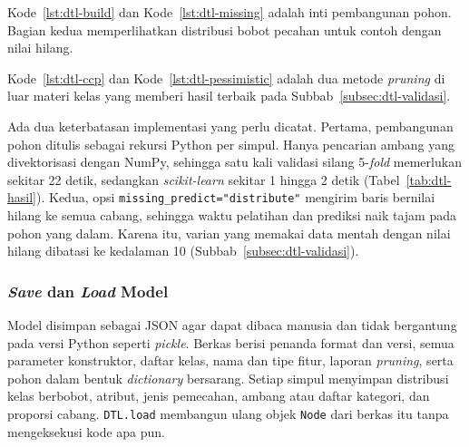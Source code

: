 
Kode~\ref{lst:dtl-build} dan Kode~\ref{lst:dtl-missing} adalah inti pembangunan pohon. Bagian kedua
memperlihatkan distribusi bobot pecahan untuk contoh dengan nilai hilang.


Kode~\ref{lst:dtl-ccp} dan Kode~\ref{lst:dtl-pessimistic} adalah dua metode \textit{pruning} di luar
materi kelas yang memberi hasil terbaik pada Subbab~\ref{subsec:dtl-validasi}.


Ada dua keterbatasan implementasi yang perlu dicatat. Pertama, pembangunan pohon ditulis sebagai
rekursi Python per simpul. Hanya pencarian ambang yang divektorisasi dengan NumPy, sehingga satu kali
validasi silang 5-\textit{fold} memerlukan sekitar 22 detik, sedangkan \textit{scikit-learn} sekitar
1 hingga 2 detik (Tabel~\ref{tab:dtl-hasil}). Kedua, opsi \texttt{missing\_predict="distribute"}
mengirim baris bernilai hilang ke semua cabang, sehingga waktu pelatihan dan prediksi naik tajam pada
pohon yang dalam. Karena itu, varian yang memakai data mentah dengan nilai hilang dibatasi ke
kedalaman 10 (Subbab~\ref{subsec:dtl-validasi}).

\subsubsection{\textit{Save} dan \textit{Load} Model}

Model disimpan sebagai JSON agar dapat dibaca manusia dan tidak bergantung pada versi Python seperti
\textit{pickle}. Berkas berisi penanda format dan versi, semua parameter konstruktor, daftar kelas,
nama dan tipe fitur, laporan \textit{pruning}, serta pohon dalam bentuk \textit{dictionary} bersarang.
Setiap simpul menyimpan distribusi kelas berbobot, atribut, jenis pemecahan, ambang atau daftar
kategori, dan proporsi cabang. \texttt{DTL.load} membangun ulang objek \texttt{Node} dari berkas itu
tanpa mengeksekusi kode apa pun.

